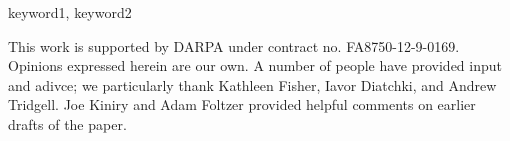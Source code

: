\documentclass{sigplanconf}
\begin{document}
\keywords
keyword1, keyword2



















\acks

This work is supported by DARPA under contract no. FA8750-12-9-0169.  Opinions
expressed herein are our own.  A number of people have provided input and
adivce; we particularly thank Kathleen Fisher, Iavor Diatchki, and Andrew
Tridgell.  Joe Kiniry and Adam Foltzer provided helpful comments on earlier
drafts of the paper.








\end{document}
